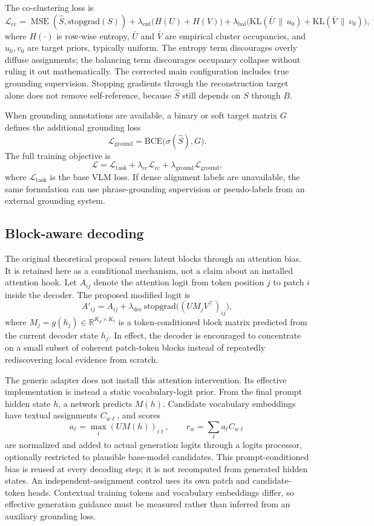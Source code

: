 \documentclass[11pt,a4paper]{article}
\newcommand{\R}{\mathbb{R}}
\newcommand{\KL}{\mathrm{KL}}
\newcommand{\BCE}{\mathrm{BCE}}
\begin{document}
The co-clustering loss is
\[
\mathcal{L}_{\mathrm{cc}} = \operatorname{MSE}(\hat S,\mathrm{stopgrad}(S)) + \lambda_{\mathrm{ent}}\big(H(U)+H(V)\big)
+ \lambda_{\mathrm{bal}}\big(\KL(\bar U\,\|\,u_0)+\KL(\bar V\,\|\,v_0)\big),
\]
where $H(\cdot)$ is row-wise entropy, $\bar U$ and $\bar V$ are empirical cluster occupancies, and $u_0,v_0$ are target priors, typically uniform. The entropy term discourages overly diffuse assignments; the balancing term discourages occupancy collapse without ruling it out mathematically. The corrected main configuration includes true grounding supervision. Stopping gradients through the reconstruction target alone does not remove self-reference, because $\hat S$ still depends on $S$ through $B$.

When grounding annotations are available, a binary or soft target matrix $G$ defines the additional grounding loss
\[
\mathcal{L}_{\mathrm{ground}} = \BCE\big(\sigma(\hat{S}), G\big).
\]
The full training objective is
\[
\mathcal{L} = \mathcal{L}_{\mathrm{task}} + \lambda_{\mathrm{cc}}\mathcal{L}_{\mathrm{cc}} + \lambda_{\mathrm{ground}}\mathcal{L}_{\mathrm{ground}},
\]
where $\mathcal{L}_{\mathrm{task}}$ is the base VLM loss. If dense alignment labels are unavailable, the same formulation can use phrase-grounding supervision or pseudo-labels from an external grounding system.

\subsection{Block-aware decoding}

The original theoretical proposal reuses latent blocks through an attention bias. It is retained here as a conditional mechanism, not a claim about an installed attention hook. Let $A_{ij}$ denote the attention logit from token position $j$ to patch $i$ inside the decoder. The proposed modified logit is
\[
A'_{ij} = A_{ij} + \lambda_{\mathrm{dec}}\,\mathrm{stopgrad}\big((UM_jV^{\top})_{ij}\big),
\]
where $M_j = g(h_j) \in \R^{K_p \times K_t}$ is a token-conditioned block matrix predicted from the current decoder state $h_j$. In effect, the decoder is encouraged to concentrate on a small subset of coherent patch-token blocks instead of repeatedly rediscovering local evidence from scratch.

The generic adapter does not install this attention intervention. Its effective implementation is instead a static vocabulary-logit prior. From the final prompt hidden state $h$, a network predicts $M(h)$. Candidate vocabulary embeddings have textual assignments $C_{w\ell}$, and scores
\[
a_\ell=\max_i(UM(h))_{i\ell},\qquad r_w=\sum_\ell a_\ell C_{w\ell}
\]
are normalized and added to actual generation logits through a logits processor, optionally restricted to plausible base-model candidates. This prompt-conditioned bias is reused at every decoding step; it is not recomputed from generated hidden states. An independent-assignment control uses its own patch and candidate-token heads. Contextual training tokens and vocabulary embeddings differ, so effective generation guidance must be measured rather than inferred from an auxiliary grounding loss.
\end{document}
